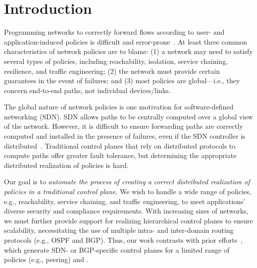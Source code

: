\section{Introduction}
Programming networks to correctly forward flows according to user- and
application-induced policies is difficult and
error-prone~\cite{troubleshooting, bgpmisconfig}. At least three
common characteristics of network policies are to blame: (1) a network
may need to satisfy several types of policies, including reachability,
isolation, service chaining, resilience, and traffic engineering; (2)
the network must provide certain guarantees in the event of failures;
and (3) most policies are global---i.e., they concern end-to-end
paths, not individual devices/links.

The global nature of network policies is one motivation for
software-defined networking (SDN). SDN allows paths to be centrally
computed over a global view of the network. However, it is difficult
to ensure forwarding paths are correctly computed and installed in the
presence of failures, even if the SDN controller is
distributed~\cite{hasdn}.  Traditional control planes that rely on
distributed protocols to compute paths offer greater fault tolerance,
but determining the appropriate distributed realization of policies is
hard.

Our goal is to {\em automate the process of creating a correct
  distributed realization of policies in a traditional control
  plane}. We wish to handle a wide range of policies, e.g.,
reachability, service chaining, and traffic engineering, to meet
applications' diverse security and compliance requirements. 
With
increasing sizes of networks, we must further provide support for
realizing hierarchical control planes to ensure scalability,
necessitating the use of multiple intra- and inter-domain routing
protocols (e.g., OSPF and BGP). 
Thus, our work contrasts with prior efforts~\cite{netegg,
  propane, merlin,simple,fattire, netkat, netkatcompiler, sol}, which
generate SDN- or BGP-specific control planes for a limited range of
policies (e.g., peering) and .



